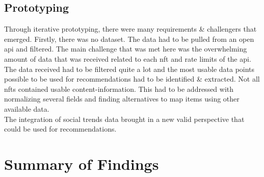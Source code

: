 \subsection{Prototyping}
Through iterative prototyping, there were many requirements \& challengers that emerged. Firstly, there was no dataset. The data had to be pulled from an open \gls{api} and filtered. The main challenge that was met here was the overwhelming amount of data that was received related to each \gls{nft} and rate limits of the \gls{api}. The data received had to be filtered quite a lot and the most usable data points possible to be used for recommendations had to be identified \& extracted. Not all \gls{nft}s contained usable content-information. This had to be addressed with normalizing several fields and finding alternatives to map items using other available data.
\\
The integration of social trends data brought in a new valid perspective that could be used for recommendations.

\section{Summary of Findings}

